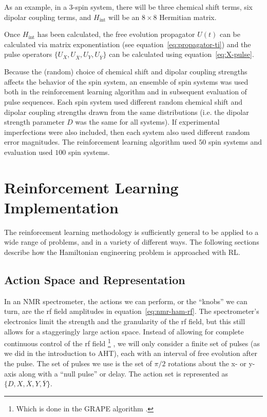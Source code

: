 As an example, in a $3$-spin system, there will be three chemical shift terms, six dipolar coupling terms, and $H_{\text{int}}$ will be an $8
\times 8$ Hermitian matrix.

Once $H_{\text{int}}$ has been calculated, the free evolution propagator $U(t)$ can be calculated via matrix exponentiation (see equation~\ref{eq:propagator-ti})
and
the pulse operators $\{ U_X, U_{\overline{X}}, U_Y, U_{\overline{Y}} \}$ can be calculated using equation~\ref{eq:X-pulse}.

Because the (random) choice of chemical shift and dipolar coupling strengths affects the behavior of the spin system, an ensemble of spin systems was used both in the reinforcement learning algorithm and in subsequent evaluation of pulse sequences.
Each spin system used different random chemical shift and dipolar coupling strengths drawn from the same distributions (i.e. the dipolar strength parameter $D$ was the same for all systems). If experimental imperfections were also included, then each system also used different random error magnitudes.
The reinforcement learning algorithm used $50$ spin systems and evaluation used $100$ spin systems.

\section{Reinforcement Learning Implementation}

The reinforcement learning methodology is sufficiently general to be applied to a wide range of problems, and in a variety of different ways.  The following sections describe how the Hamiltonian engineering problem is approached with RL.

\subsection{Action Space and Representation}

In an NMR spectrometer, the actions we can perform, or the ``knobs'' we can turn, are the rf field amplitudes in equation~\ref{eq:nmr-ham-rf}.
The spectrometer's electronics limit the strength and the granularity of the rf field,
but this still allows for a staggeringly large action space. Instead of allowing for complete continuous control of the rf field%
\footnote{
Which is done in the GRAPE algorithm \cite{Khaneja-2005}.
}
, we will only consider a finite set of pulses (as we did in the introduction to AHT), each with an interval of free evolution after the pulse. The set of pulses we use is the set of $\pi/2$ rotations about the x- or y-axis along with a ``null pulse'' or delay. The action set is represented as $\{ D, X, \overline{X}, Y, \overline{Y} \}$.

